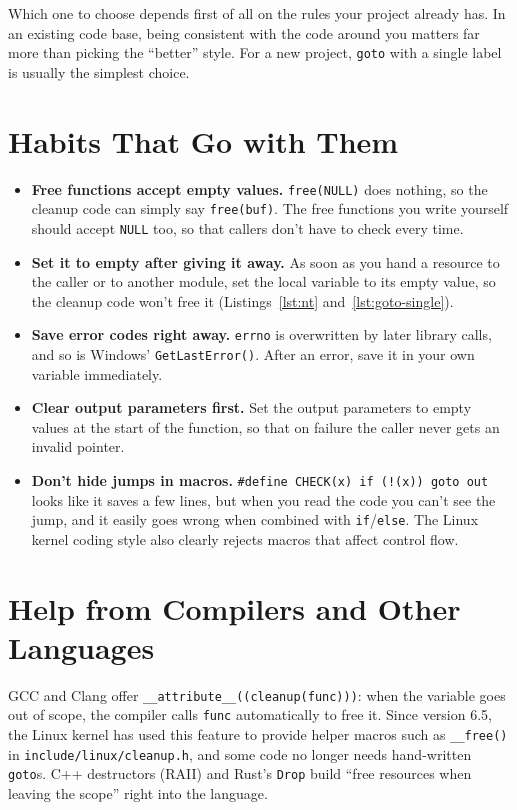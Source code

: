 Which one to choose depends first of all on the rules your project already has. In an existing code base, being consistent with the code around you matters far more than picking the ``better'' style. For a new project, \texttt{goto} with a single label is usually the simplest choice.

\section{Habits That Go with Them}

\begin{itemize}
  \item \textbf{Free functions accept empty values.} \texttt{free(NULL)} does nothing, so the cleanup code can simply say \texttt{free(buf)}. The free functions you write yourself should accept \texttt{NULL} too, so that callers don't have to check every time.
  \item \textbf{Set it to empty after giving it away.} As soon as you hand a resource to the caller or to another module, set the local variable to its empty value, so the cleanup code won't free it (Listings~\ref{lst:nt} and~\ref{lst:goto-single}).
  \item \textbf{Save error codes right away.} \texttt{errno} is overwritten by later library calls, and so is Windows' \texttt{GetLastError()}. After an error, save it in your own variable immediately.
  \item \textbf{Clear output parameters first.} Set the output parameters to empty values at the start of the function, so that on failure the caller never gets an invalid pointer.
  \item \textbf{Don't hide jumps in macros.} \texttt{\#define CHECK(x) if (!(x)) goto out} looks like it saves a few lines, but when you read the code you can't see the jump, and it easily goes wrong when combined with \texttt{if}/\texttt{else}. The Linux kernel coding style also clearly rejects macros that affect control flow.
\end{itemize}

\section{Help from Compilers and Other Languages}

GCC and Clang offer \texttt{\_\_attribute\_\_((cleanup(func)))}: when the variable goes out of scope, the compiler calls \texttt{func} automatically to free it. Since version 6.5, the Linux kernel has used this feature to provide helper macros such as \texttt{\_\_free()} in \texttt{include/linux/cleanup.h}, and some code no longer needs hand-written \texttt{goto}s. C++ destructors (RAII) and Rust's \texttt{Drop} build ``free resources when leaving the scope'' right into the language.

